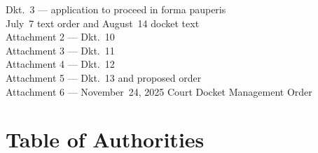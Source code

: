 \documentclass[14pt]{extarticle}
\begin{document}
\begin{singlespace}
\hspace{2em}Dkt.\ 3 --- application to proceed in forma pauperis \\
\hspace{2em}July~7 text order and August~14 docket text \\
\hspace{1em}Attachment 2 --- Dkt.\ 10 \\
\hspace{1em}Attachment 3 --- Dkt.\ 11 \\
\hspace{1em}Attachment 4 --- Dkt.\ 12 \\
\hspace{1em}Attachment 5 --- Dkt.\ 13 and proposed order \\
\hspace{1em}Attachment 6 --- November~24, 2025 Court Docket Management Order 
\end{singlespace}

\clearpage
\section*{Table of Authorities}
\end{document}
